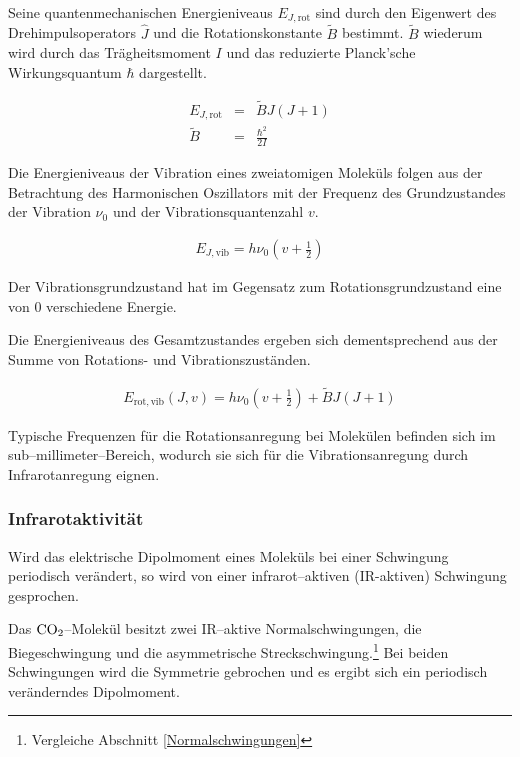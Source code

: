 \documentclass[12pt,a4paper]{scrartcl}
\numberwithin{equation}{section} %
\begin{document}
Seine quantenmechanischen Energieniveaus $E_{J, \mathrm{rot}}$ sind durch den Eigenwert des Drehimpulsoperators $\hat J$ und die Rotationskonstante $\tilde{B}$ bestimmt. $\tilde{B}$  wiederum wird durch das Trägheitsmoment $I$ und das reduzierte Planck'sche Wirkungsquantum $\hbar$ dargestellt.

\begin{eqnarray}
  E_{J, \mathrm{rot}} &=& \tilde{B} J (J + 1) \\
  \tilde{B} &=& \frac{\hbar^2}{2 I}
\end{eqnarray}

\noindent
Die Energieniveaus der Vibration eines zweiatomigen Moleküls folgen aus der Betrachtung des Harmonischen Oszillators mit der Frequenz des Grundzustandes der Vibration $\nu_0$ und der Vibrationsquantenzahl $v$.

\begin{eqnarray}
  E_{J, \mathrm{vib}} = h \nu_0\left(v + \frac{1}{2}\right)
\end{eqnarray}

\noindent
Der Vibrationsgrundzustand hat im Gegensatz zum Rotationsgrundzustand eine von $0$ verschiedene Energie.

Die Energieniveaus des Gesamtzustandes ergeben sich dementsprechend aus der Summe von Rotations- und Vibrationszuständen.

\begin{eqnarray}
  E_\mathrm{rot,vib}(J,v) = h \nu_0 \left(v + \frac{1}{2}\right) + \tilde{B} J (J + 1) \label{eq:E rot,vib}
\end{eqnarray}

\noindent
Typische Frequenzen für die Rotationsanregung bei Molekülen befinden sich im sub--millimeter--Bereich, wodurch sie sich für die Vibrationsanregung durch Infrarotanregung eignen.

\hypertarget{infrarotaktivituxe4t}{\subsubsection{Infrarotaktivität}\label{infrarotaktivituxe4t}}
Wird das elektrische Dipolmoment eines Moleküls bei einer Schwingung periodisch verändert, so wird von einer infrarot--aktiven (IR-aktiven) Schwingung gesprochen.

Das $\ce{CO_2}$--Molekül besitzt zwei  IR--aktive Normalschwingungen, die Biegeschwingung und die asymmetrische Streckschwingung.\footnote{Vergleiche Abschnitt \ref{Normalschwingungen}} Bei beiden Schwingungen wird die Symmetrie gebrochen und es ergibt sich ein periodisch veränderndes Dipolmoment.
\end{document}
